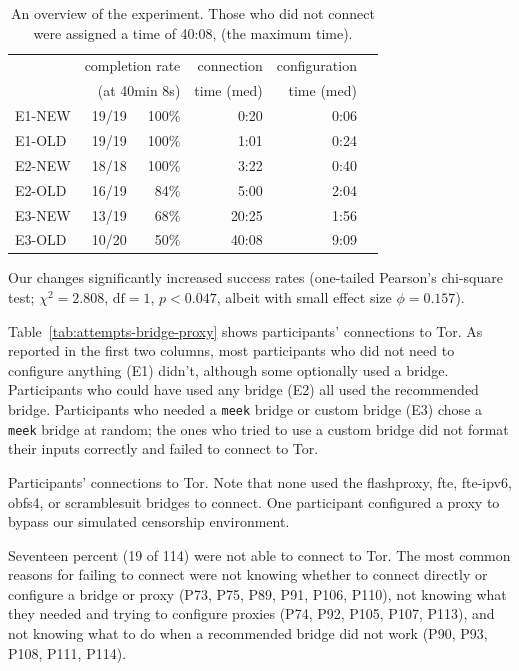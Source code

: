 \documentclass[USenglish,oneside,twocolumn]{article}
\begin{document}
\begin{table}[t]
\centering
\begin{tabular}{l r r r r r}
& \multicolumn{2}{r}{completion rate} & \multicolumn{1}{r}{connection} & \multicolumn{1}{r}{configuration} \\
& \multicolumn{2}{r}{(at 40min 8s)} & \multicolumn{1}{r}{time (med)} & \multicolumn{1}{r}{time (med)} \\
\noalign{\hrule}
E1-NEW & 19/19 & 100\% & 0:20 & 0:06 \\
E1-OLD & 19/19 & 100\% & 1:01 & 0:24 \\
E2-NEW & 18/18 & 100\% & 3:22 & 0:40 \\
E2-OLD & 16/19 & 84\% & 5:00 & 2:04 \\
E3-NEW & 13/19 & 68\% & 20:25 & 1:56 \\
E3-OLD & 10/20 & 50\% & 40:08 & 9:09 \\
\end{tabular}
\caption{
An overview of the experiment. 
Those who did not connect were assigned a time of 40:08, 
(the maximum time).
}
\label{table:participant-summary}
\end{table}

Our changes significantly increased success rates (one-tailed Pearson's chi-square test; $\chi^2 = 2.808$, $\mbox{df} = 1$, $p < 0.047$, albeit with small effect size $\phi=0.157$).

Table~\ref{tab:attempts-bridge-proxy} shows participants' connections to Tor. As reported in the first two columns, most participants who did not need to configure anything (E1) didn't, although some optionally used a bridge. Participants who could have used any bridge (E2) all used the recommended bridge. Participants who needed a \texttt{meek} bridge or custom bridge (E3) chose a \texttt{meek} bridge at random; the ones who tried to use a custom bridge did not format their inputs correctly and failed to connect to Tor.

\begin{table}[t]
\centering

\caption{
Participants' connections to Tor.
Note that none used the flashproxy, fte, fte-ipv6, obfs4, or scramblesuit bridges to connect. 
One participant configured a proxy to bypass our simulated censorship environment.
}
\label{tab:attempts-bridge-proxy}
\end{table} 

Seventeen percent (19 of 114) were not able to connect to Tor. The most common reasons for failing to connect were not knowing whether to connect directly or configure a bridge or proxy (P73, P75, P89, P91, P106, P110), not knowing what they needed and trying to configure proxies (P74, P92, P105, P107, P113), and not knowing what to do when a recommended bridge did not work (P90, P93, P108, P111, P114). 
\end{document}

